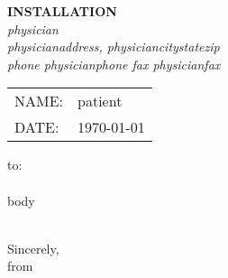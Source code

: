 \documentclass{article}
\begin{document}
\begin{center}
	{\textbf{{{INSTALLATION}}}} \\
	{\textsl{{{physician}}}} \\
	\textsl{{{physicianaddress}}, {{physiciancitystatezip}}} \\
	\textsl{phone {{physicianphone}} fax {{physicianfax}}}
\end{center}


\begin{tabular}{ll}
	NAME:	&	{{patient}}	\\
	DATE:	&	\today
\end{tabular}


{{to}}: \\

\hfill \\

{{body}}

\hfill \\

Sincerely, \\
{{from}}
\end{document}
